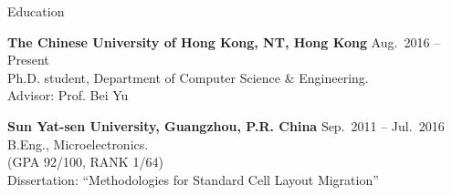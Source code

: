 

\begin{rSection}{Education}

{\bf The Chinese University of Hong Kong, NT, Hong Kong} \hfill { Aug.~2016 -- Present}\\
Ph.D. student, Department of Computer Science \& Engineering. \\
Advisor: Prof. Bei Yu

{\bf Sun Yat-sen University, Guangzhou, P.R. China} \hfill { Sep.~2011 -- Jul.~2016}\\
B.Eng., Microelectronics.\\
(GPA 92/100, RANK 1/64) \\
Dissertation: ``Methodologies for Standard Cell Layout Migration''
\end{rSection}


